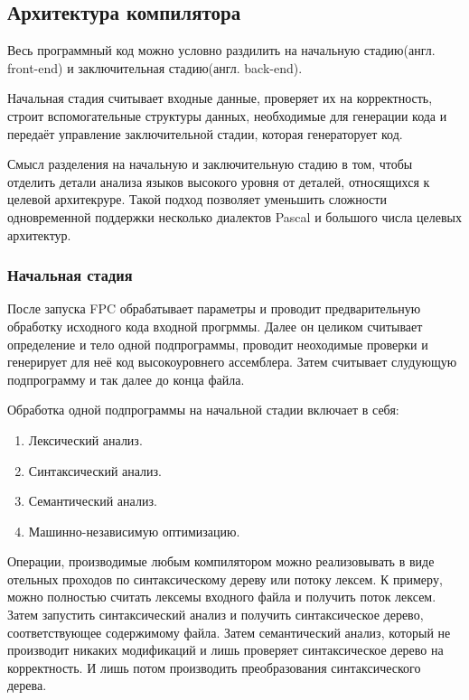 \documentclass{imcs}
\begin{document}
\subsection{Архитектура компилятора}

Весь программный код можно условно раздилить на начальную стадию(англ. front-end)
и заключительная стадию(англ. back-end)\cite{dragonbook}.

Начальная стадия считывает входные данные, проверяет их на корректность, строит
вспомогательные структуры данных, необходимые для генерации кода и передаёт 
управление заключительной стадии, которая генераторует код.

Смысл разделения на начальную и заключительную стадию в
том, чтобы отделить детали анализа языков высокого уровня от деталей,
относящихся к целевой архитекруре. Такой подход позволяет уменьшить сложности
одновременной поддержки несколько диалектов Pascal и большого числа целевых
архитектур.

\subsubsection{Начальная стадия}

После запуска FPC обрабатывает параметры и проводит предварительную обработку
исходного кода входной прогрммы. Далее он целиком считывает определение и тело
одной подпрограммы, проводит неоходимые проверки и генерирует для неё
код высокоуровнего ассемблера. Затем считывает слудующую подпрограмму и так далее
до конца файла.

Обработка одной подпрограммы на начальной стадии включает в себя:
\begin{enumerate}
    \item Лексический анализ.
    \item Синтаксический анализ.
    \item Семантический анализ.
    \item Машинно-независимую оптимизацию.
\end{enumerate}

Операции, производимые любым компилятором можно реализовывать в виде
отельных проходов по синтаксическому дереву или потоку лексем. К примеру, можно
полностью считать лексемы входного файла и получить поток лексем. Затем запустить
синтаксический анализ и получить синтаксическое дерево, соответствующее содержимому
файла. Затем семантический анализ, который не производит никаких модификаций и 
лишь проверяет синтаксическое дерево на корректность. И лишь потом производить
преобразования синтаксического дерева.
\end{document}
